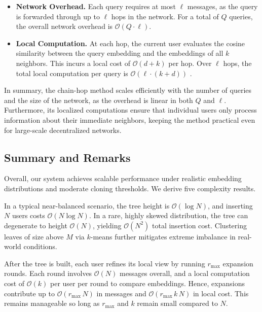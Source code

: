 \documentclass[10pt,journal]{IEEEtran}
\begin{document}
\begin{itemize}
\item \textbf{Network Overhead.} Each query requires at most \(\ell\) messages, as the query is forwarded through up to \(\ell\) hops in the network. For a total of \(Q\) queries, the overall network overhead is \(\mathcal{O}(Q \cdot \ell)\).

\item \textbf{Local Computation.} At each hop, the current user evaluates the cosine similarity between the query embedding and the embeddings of all \(k\) neighbors. This incurs a local cost of \(\mathcal{O}(d  +  k)\) per hop. Over \(\ell\) hops, the total local computation per query is \(\mathcal{O}(\ell \cdot (k + d))\) .
\end{itemize}

In summary, the chain-hop method scales efficiently with the number of queries and the size of the network, as the overhead is linear in both \(Q\) and \(\ell\). Furthermore, its localized computations ensure that individual users only process information about their immediate neighbors, keeping the method practical even for large-scale decentralized networks.

\subsection{Summary and Remarks}
\label{subsec:complexity_summary}

Overall, our system achieves scalable performance under realistic embedding distributions and moderate cloning thresholds. We derive five complexity results.

In a typical near-balanced scenario, the tree height is $\mathcal{O}(\log N)$, and inserting $N$ users costs $\mathcal{O}(N \log N)$. In a rare, highly skewed distribution, the tree can degenerate to height $\mathcal{O}(N)$, yielding $\mathcal{O}(N^2)$ total insertion cost. Clustering leaves of size above $M$ via $k$-means further mitigates extreme imbalance in real-world conditions.

After the tree is built, each user refines its local view by running $r_{\max}$ expansion rounds. Each round involves $\mathcal{O}(N)$ messages overall, and a local computation cost of $\mathcal{O}(k)$ per user per round to compare embeddings. Hence, expansions contribute up to $\mathcal{O}(r_{\max} \, N)$ in messages and $\mathcal{O}(r_{\max} \, k \, N)$ in local cost. This remains manageable so long as $r_{\max}$ and $k$ remain small compared to $N$.
\end{document}
